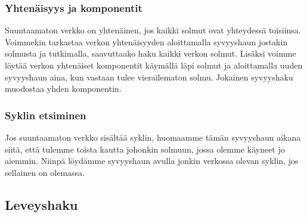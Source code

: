 \subsubsection{Yhtenäisyys ja komponentit}

Suuntaamaton verkko on yhtenäinen, 
jos kaikki solmut ovat yhteydessä toisiinsa.
Voimmekin tarkastaa verkon yhtenäisyyden aloittamalla
syvyyshaun jostakin solmusta ja tutkimalla,
saavuttaako haku kaikki verkon solmut.
Lisäksi voimme löytää verkon yhtenäiset komponentit
käymällä läpi solmut ja aloittamalla uuden syvyyshaun aina,
kun vastaan tulee vierailematon solmu.
Jokainen syvyyshaku muodostaa yhden komponentin.

\subsubsection{Syklin etsiminen}


Jos suuntaamaton verkko sisältää syklin,
huomaamme tämän syvyyshaun aikana siitä,
että tulemme toista kautta johonkin solmuun,
jossa olemme käyneet jo aiemmin.
Niinpä löydämme syvyyshaun avulla jonkin verkossa olevan
syklin, jos sellainen on olemassa.

\subsection{Leveyshaku}

